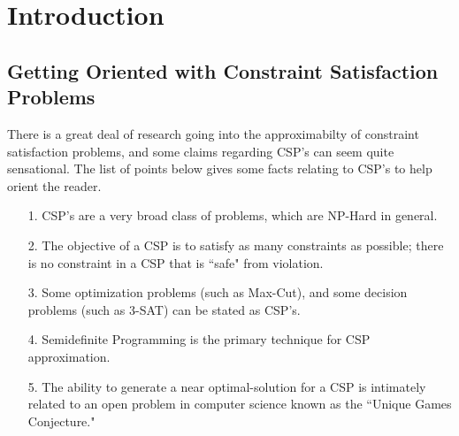 \section{Introduction}

\subsection{Getting Oriented with Constraint Satisfaction Problems}

There is a great deal of research going into the approximabilty of constraint satisfaction problems, and some claims regarding CSP's can seem quite sensational. 
The list of points below gives some facts relating to CSP's to help orient the reader.

\begin{itemize}
\item[1.] CSP's are a very broad class of problems, which are NP-Hard in general.
\item[2.] The objective of a CSP is to satisfy as many constraints as possible; there is no constraint in a CSP that is ``safe" from violation.
\item[3.] Some optimization problems (such as Max-Cut), and some decision problems (such as 3-SAT) can be stated as CSP's.
\item[4.] Semidefinite Programming is the primary technique for CSP approximation.
\item[5.] The ability to generate a near optimal-solution for a CSP is intimately related to an open problem in computer science known as the ``Unique Games Conjecture."
\end{itemize}

%